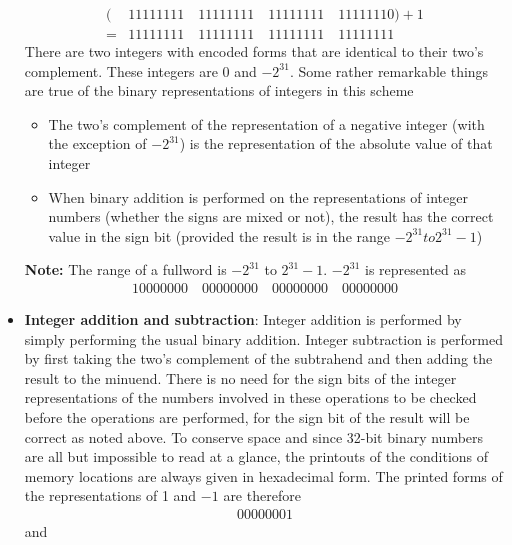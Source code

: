 \documentclass{report}
\begin{document}
\begin{itemize}
            \begin{align*}
                (&11111111 \quad 11111111 \quad 11111111 \quad 11111110) + 1 \\
                = &11111111 \quad 11111111 \quad 11111111 \quad 11111111
            \end{align*}
            There are two integers with encoded forms that are identical to their two's complement. These integers are 0 and $-2^{31}$.
            \bigbreak \noindent 
            Some rather remarkable things are true of the binary representations of integers in this scheme
            \begin{itemize}
                \item The two's complement of the representation of a negative integer (with the exception of $-2^{31}$) is the representation of the absolute value of that integer
                \item When binary addition is performed on the representations of integer numbers (whether the signs are mixed or not), the result has the correct value in the sign bit (provided the result is in the range $-2^{31} to 2^{31} - 1$)
            \end{itemize}
            \bigbreak \noindent 
            \textbf{Note:} The range of a fullword is $-2^{31}$ to $2^{31} -1$. $-2^{31}$ is represented as 
            \begin{align*}
                10000000 \quad 00000000 \quad 00000000 \quad 00000000
            \end{align*}
        \item \textbf{Integer addition and subtraction}: Integer addition is performed by simply performing the usual binary addition. Integer subtraction is performed by first taking the two's complement of the subtrahend and then adding the result to the minuend. There is no need for the sign bits of the integer representations of the numbers involved in these operations to be checked before the operations are performed, for the sign bit of the result will be correct as noted above.
            \bigbreak \noindent 
            To conserve space and since 32-bit binary numbers are all but impossible to read at a glance, the printouts of the conditions of memory locations are always given in hexadecimal form. The printed forms of the representations of 1 and $-1$ are therefore
            \begin{align*}
                00000001
            \end{align*}
            and 
            \begin{align*}

\end{align*}
\end{itemize}
\end{document}
